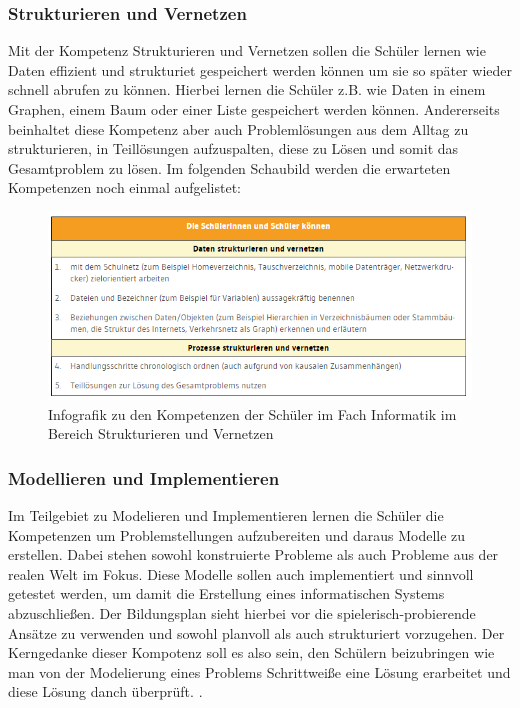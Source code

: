 \subsubsection{Strukturieren und Vernetzen}
Mit der Kompetenz Strukturieren und Vernetzen sollen die Schüler lernen wie Daten effizient und strukturiet gespeichert werden können um sie so später wieder schnell abrufen zu können. Hierbei lernen die Schüler z.B. wie Daten in einem Graphen, einem Baum oder einer Liste gespeichert werden können. Andererseits beinhaltet diese Kompetenz aber auch Problemlösungen aus dem Alltag zu strukturieren, in Teillösungen aufzuspalten, diese zu Lösen und somit das Gesamtproblem zu lösen.\cite{StruktVer} Im folgenden Schaubild werden die erwarteten Kompetenzen noch einmal aufgelistet:


\begin{figure}[H]
	\centering
	\includegraphics[width=\textwidth,height=\textheight,keepaspectratio]{images/struc.png}
	\caption{Infografik zu den Kompetenzen der Schüler im Fach Informatik im Bereich Strukturieren und Vernetzen \cite{StruktVer}}
	\label{Strukturieren und Vernetzen Infografik}
\end{figure}

\subsubsection{Modellieren und Implementieren}

Im Teilgebiet zu Modelieren und Implementieren lernen die Schüler die Kompetenzen um Problemstellungen aufzubereiten und daraus Modelle zu erstellen. Dabei stehen sowohl konstruierte Probleme als auch Probleme aus der realen Welt im Fokus. Diese Modelle sollen auch implementiert und sinnvoll getestet werden, um damit die Erstellung eines informatischen Systems abzuschließen. Der Bildungsplan sieht hierbei vor die spielerisch-probierende Ansätze zu verwenden und sowohl planvoll als auch strukturiert vorzugehen. Der Kerngedanke dieser Kompotenz soll es also sein, den Schülern beizubringen wie man von der Modelierung eines Problems Schrittweiße eine Lösung erarbeitet und diese Lösung danch überprüft. \cite{Model}.

